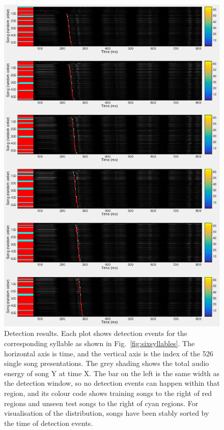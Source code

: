 \documentclass[10pt,letterpaper]{article}
\newcommand\fig[1]{Fig.~\ref{#1}}
\begin{document}
\begin{figure}
  \includegraphics[width=\textwidth]{6_syllables_out}
    \caption{Detection results. Each plot shows detection events for
      the corresponding syllable as shown in
      \fig{fig:sixsyllables}. The horizontal axis is time, and the
      vertical axis is the index of the 526 single song
      presentations. The grey shading shows the total audio energy of
      song Y at time X. The bar on the left is the same width as the
      detection window, so no detection events can happen within that
      region, and its colour code shows training songs to the right of
      red regions and unseen test songs to the right of cyan
      regions. For visualisation of the distribution, songs have been
      stably sorted by the time of detection events.}
  \label{fig:sixsyllables_out}
\end{figure}
\end{document}

